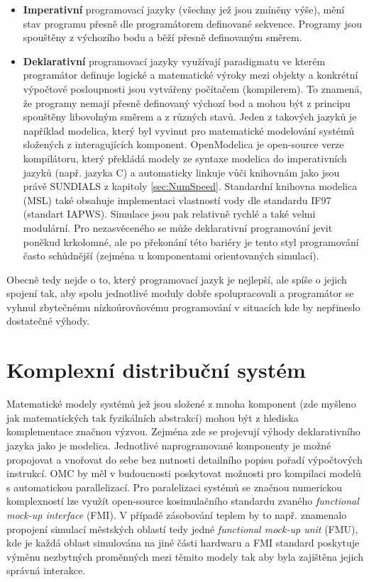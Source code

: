 \begin{itemize}
\item
\textbf{Imperativní} programovací jazyky (všechny jež jsou zmíněny výše), mění
stav programu přesně dle programátorem definované sekvence. Programy jsou
spouštěny z výchozího bodu a běží přesně definovaným směrem.
\item
\textbf{Deklarativní} programovací jazyky využívají paradigmatu ve kterém
programátor definuje logické a matematické výroky mezi objekty a konkrétní
výpočtové posloupnosti jsou vytvářeny počítačem (kompilerem). To znamená, že
programy nemají přesně definovaný výchozí bod a mohou být z principu spouštěny
libovolným směrem a z různých stavů. Jeden z takových jazyků je například
modelica, který byl vyvinut pro matematické modelování systémů složených z
interagujících komponent. OpenModelica  je open-source verze
kompilátoru, který překládá modely ze syntaxe modelica do imperativních jazyků
(např. jazyka C) a automaticky linkuje vůči knihovnám jako jsou právě SUNDIALS
z kapitoly \ref{sec:NumSpeed}. Standardní knihovna modelica (MSL) také obsahuje
implementaci vlastností vody dle standardu IF97 (standart IAPWS). Simulace jsou
pak relativně rychlé a také velmi modulární. Pro nezasvěceného se může
deklarativní programování jevit poněkud krkolomné, ale po překonání této
bariéry je tento styl programování často schůdnější (zejména u komponentami
orientovaných simulací).
\end{itemize}
Obecně tedy nejde o to, který programovací jazyk je nejlepší, ale spíše o
jejich spojení tak, aby spolu jednotlivé moduly dobře spolupracovali a
programátor se vyhnul zbytečnému nízkoúrovňovému programování v situacích kde
by nepřineslo dostatečné výhody.
\section{Komplexní distribuční systém}
\label{sec:Complex_distr_sys}
Matematické modely systémů jež jsou složené z mnoha komponent (zde myšleno jak
matematických tak fyzikálních abstrakcí) mohou být z hlediska komplementace
značnou výzvou. Zejména zde se projevují výhody deklarativního jazyka jako je
modelica. Jednotlivé naprogramované komponenty je možné propojovat a vnořovat
do sebe bez nutnosti detailního popisu pořadí výpočtových instrukcí. OMC by měl
v budoucnosti poskytovat možnosti pro kompilaci modelů s automatickou
parallelizací. Pro paralelizaci systémů se značnou numerickou komplexností lze
využít open-source kosimulačního standardu zvaného \textit{functional mock-up
interface} (FMI). V případě zásobování teplem by to např. znamenalo propojení
simulací městských oblastí tedy jedné \textit{functional mock-up unit} (FMU),
kde je každá oblast simulována na jiné části hardwaru a FMI standard poskytuje
výměnu nezbytných proměnných mezi těmito modely tak aby byla zajištěna jejich
správná interakce.

